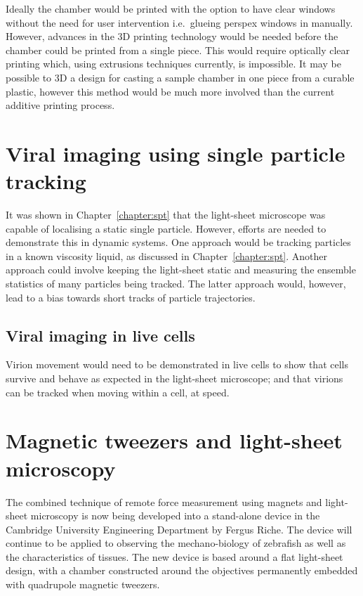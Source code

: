 Ideally the chamber would be printed with the option to have clear windows without the need for user intervention i.e.\ glueing perspex windows in manually.
However, advances in the \gls{3D} printing technology would be needed before the chamber could be printed from a single piece.
This would require optically clear printing which, using extrusions techniques currently, is impossible.
It may be possible to \gls{3D} a design for casting a sample chamber in one piece from a curable plastic, however this method would be much more involved than the current additive printing process.

\section{Viral imaging using single particle tracking}

It was shown in Chapter~\ref{chapter:spt} that the light-sheet microscope was capable of localising a static single particle.
However, efforts are needed to demonstrate this in dynamic systems.
One approach would be tracking particles in a known viscosity liquid, as discussed in Chapter~\ref{chapter:spt}.
Another approach could involve keeping the light-sheet static and measuring the ensemble statistics of many particles being tracked.
The latter approach would, however, lead to a bias towards short tracks of particle trajectories.

\subsection{Viral imaging in live cells}

Virion movement would need to be demonstrated in live cells to show that cells survive and behave as expected in the light-sheet microscope; and that virions can be tracked when moving within a cell, at speed.

\section{Magnetic tweezers and light-sheet microscopy}

The combined technique of remote force measurement using magnets and light-sheet microscopy is now being developed into a stand-alone device in the Cambridge University Engineering Department by Fergus Riche.
The device will continue to be applied to observing the mechano-biology of zebrafish as well as the characteristics of tissues. %
The new device is based around a flat light-sheet design, with a chamber constructed around the objectives permanently embedded with quadrupole magnetic tweezers.

